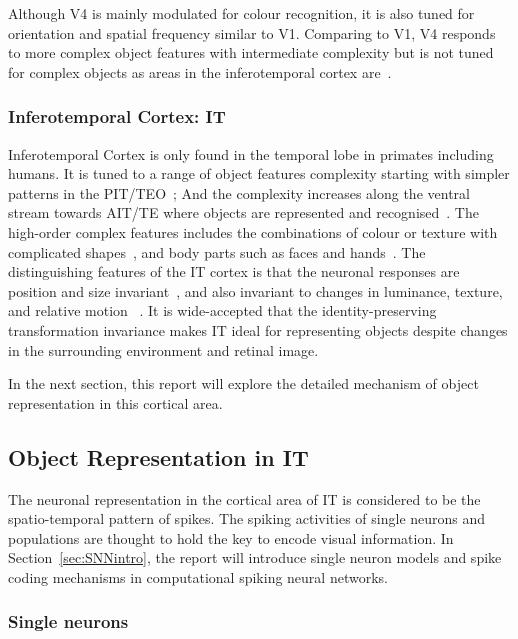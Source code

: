 Although V4 is mainly modulated for colour recognition, it is also tuned for orientation and spatial frequency similar to V1.
Comparing to V1, V4 responds to more complex object features with intermediate complexity but is not tuned for complex objects as areas in the inferotemporal cortex are~\cite{williams2007biological}.

\subsubsection{Inferotemporal Cortex: IT}
Inferotemporal Cortex is only found in the temporal lobe in primates including humans. 
It is tuned to a range of object features complexity starting with simpler patterns in the PIT/TEO~\cite{tanaka1991coding};
And the complexity increases along the ventral stream towards AIT/TE where objects are represented and recognised~\cite{dean1976effects}.
The high-order complex features includes the combinations of colour or texture with complicated shapes~\cite{tanaka1991coding}, and body parts such as faces and hands~\cite{gross2008single}.
The distinguishing features of the IT cortex is that the neuronal responses are position and size invariant~\cite{schwartz1983shape,logothetis1995psychophysical}, and also invariant to changes in luminance, texture, and relative motion ~\cite{sary1993cue,perry2014feature}.
It is wide-accepted that the identity-preserving transformation invariance makes IT ideal for representing objects despite changes in the surrounding environment and retinal image.

In the next section, this report will explore the detailed mechanism of object representation in this cortical area.
\subsection{Object Representation in IT}
\label{sec:orIT}
The neuronal representation in the cortical area of IT is considered to be the spatio-temporal pattern of spikes.
The spiking activities of single neurons and populations are thought to hold the key to encode visual information.
In Section~\ref{sec:SNNintro}, the report will introduce single neuron models and spike coding mechanisms in computational spiking neural networks.

\subsubsection{Single neurons}

